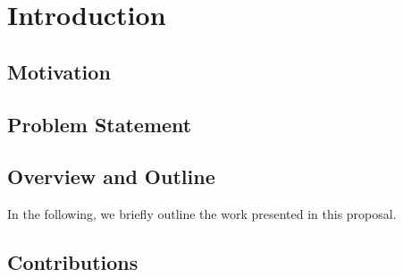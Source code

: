 \chapter{Introduction}
\label{chap:introduction}

\lipsum

\section{Motivation}
\label{sec:intro:motivation}


\section{Problem Statement}
\label{sec:intro:problem}

\section{Overview and Outline}
\label{sec:intro:overview}

In the following, we briefly outline the work presented in this proposal. 


\section{Contributions}
\label{sec:intro:contributions}


